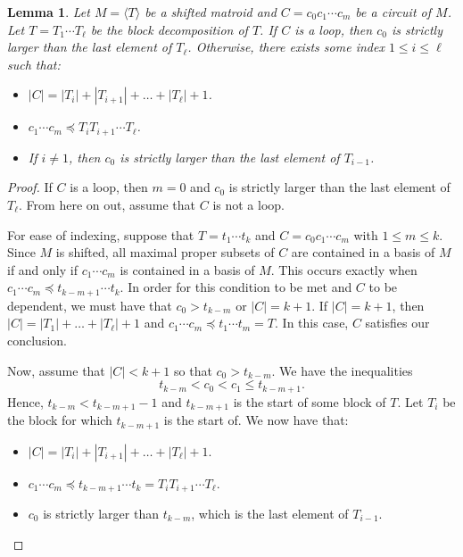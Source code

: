 \documentclass{amsart}
\theoremstyle{definition}
\theoremstyle{plain}
\newtheorem{lemma}[defn]{Lemma}
\begin{document}
\begin{lemma}
  \label{lem:circuits}
  Let $M= \langle T \rangle$ be a shifted matroid and $C=c_0c_1\cdots c_m$ be a circuit of $M$. Let $T=T_1\cdots T_\ell$ be the block decomposition of $T$. If $C$ is a loop, then $c_0$ is strictly larger than the last element of $T_\ell$. Otherwise, there exists some index $1\leq i \leq \ell$ such that:
  \begin{itemize}
    \item $|C| = |T_{i}|+|T_{i+1}|+\ldots+|T_\ell| +1$.
    \item $c_1\cdots c_m\preceq T_{i}T_{i+1}\cdots T_\ell$.
    \item If $i\neq 1$, then $c_0$ is strictly larger than the last element of $T_{i-1}$.
  \end{itemize}
\end{lemma}
\begin{proof}
  If $C$ is a loop, then $m=0$ and $c_0$ is strictly larger than the last element of $T_\ell$. From here on out, assume that $C$ is not a loop. 

  For ease of indexing, suppose that $T=t_1\cdots t_k$ and $C=c_0c_1\cdots c_m$ with $1\leq m \leq k$. Since $M$ is shifted, all maximal proper subsets of $C$ are contained in a basis of $M$ if and only if $c_1\cdots c_m$ is contained in a basis of $M$. This occurs exactly when $c_1\cdots c_m \preceq t_{k-m+1}\cdots t_{k}$. In order for this condition to be met and $C$ to be dependent, we must have that $c_0 > t_{k-m}$ or $|C|=k+1$. If $|C|=k+1$, then $|C| = |T_1|+\ldots + |T_\ell|+1$ and $c_1\cdots c_m\preceq t_1\cdots t_m = T$.
  In this case, $C$ satisfies our conclusion.

  Now, assume that $|C|<k+1$ so that $c_0> t_{k-m}$. We have the inequalities
  \[t_{k-m}<c_0< c_1 \leq t_{k-m+1}. \]
  Hence, $t_{k-m}< t_{k-m+1}-1$ and $t_{k-m+1}$ is the start of some block of $T$. Let $T_{i}$ be the block for which $t_{k-m+1}$ is the start of. We now have that:
  \begin{itemize}
    \item $|C| = |T_{i}|+|T_{i+1}|+\ldots+|T_\ell| +1$.
    \item $c_1\cdots c_m\preceq t_{k-m+1}\cdots t_k= T_{i}T_{i+1}\cdots T_\ell$.
    \item $c_0$ is strictly larger than $t_{k-m}$, which is the last element of $T_{i-1}$.
  \end{itemize}
\end{proof}
\end{document}
